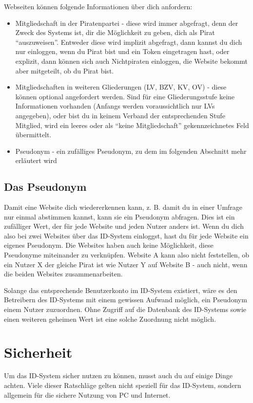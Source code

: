 \documentclass[parskip=half]{scrartcl}
\begin{document}
Webseiten können folgende Informationen über dich anfordern:
\begin{itemize}
	\item Mitgliedschaft in der Piratenpartei - diese wird immer abgefragt, denn der Zweck des Systems ist, dir die Möglichkeit zu geben, dich als Pirat "`auszuweisen"'.
		Entweder diese wird implizit abgefragt, dann kannst du dich nur einloggen, wenn du Pirat bist und ein Token eingetragen hast,
		oder explizit, dann können sich auch Nichtpiraten einloggen, die Website bekommt aber mitgeteilt, ob du Pirat bist.
	
	\item Mitgliedschaften in weiteren Gliederungen (LV, BZV, KV, OV) - diese können optional angefordert werden.
		Sind für eine Gliederungsstufe keine Informationen vorhanden (Anfangs werden voraussichtlich nur LVs angegeben),
		oder bist du in keinem Verband der entsprechenden Stufe Mitglied,
		wird ein leeres oder als "`keine Mitgliedschaft"' gekennzeichnetes Feld übermittelt.
		
	\item Pseudonym - ein zufälliges Pseudonym, zu dem im folgenden Abschnitt mehr erläutert wird
\end{itemize}

\subsection{Das Pseudonym}
Damit eine Website dich wiedererkennen kann, z. B. damit du in einer Umfrage nur einmal abstimmen kannst, kann sie ein Pseudonym abfragen.
Dies ist ein zufälliger Wert, der für jede Website und jeden Nutzer anders ist.
Wenn du dich also bei zwei Websites über das ID-System einloggst, hast du für jede Website ein eigenes Pseudonym.
Die Websites haben auch keine Möglichkeit, diese Pseudonyme miteinander zu verknüpfen.
Website A kann also nicht feststellen, ob ein Nutzer X der gleiche Pirat ist wie Nutzer Y auf Website B - auch nicht, wenn die beiden Websites zusammenarbeiten.

Solange das entsprechende Benutzerkonto im ID-System existiert, wäre es den Betreibern des ID-Systems mit einem gewissen Aufwand möglich, ein Pseudonym einem Nutzer zuzuordnen.
Ohne Zugriff auf die Datenbank des ID-Systems sowie einen weiteren geheimen Wert ist eine solche Zuordnung nicht möglich.

\newpage
\section{Sicherheit}
Um das ID-System sicher nutzen zu können, musst auch du auf einige Dinge achten.
Viele dieser Ratschläge gelten nicht speziell für das ID-System, sondern allgemein für die sichere Nutzung von PC und Internet.
\end{document}
